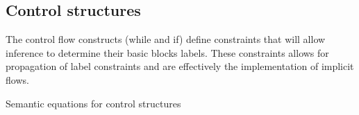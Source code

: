 \subsection{Control structures}
The control flow constructs (while and if) define constraints that will allow inference to determine their basic blocks labels.
These constraints allows for propagation of label constraints and are effectively the implementation of implicit flows.

\begin{table}[H]
\begin{semanticequations}
 \seSpace
 \seSpace
%
\end{semanticequations}
\caption{Semantic equations for control structures}
\label{cstr:controlstructures}
\end{table}

